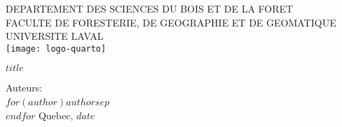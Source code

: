 
\begin{titlepage} 
    \centering
    {\large DEPARTEMENT DES SCIENCES DU BOIS ET DE LA FORET \\}
    {\large FACULTE DE FORESTERIE, DE GEOGRAPHIE ET DE GEOMATIQUE \\}
    {\large UNIVERSITE LAVAL \\}
    {\texttt{[image: logo-quarto]} \\}
    \vspace{2cm}
    {\Huge\bfseries\underline {$title$} \par}
    \vspace{2cm}
    {\Large Auteurs: \\}
    $for(author)${\large {$author$}}$sep${\\}$endfor$
    \vfill
    {\large Quebec, {$date$}}
\end{titlepage}